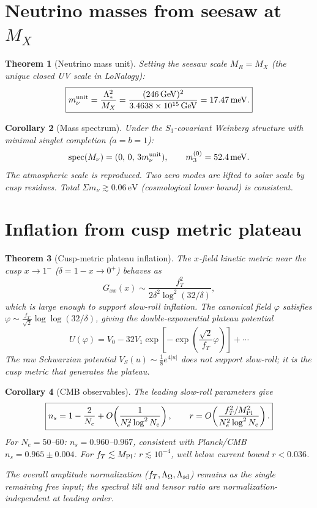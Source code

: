 \documentclass[12pt]{article}
\theoremstyle{plain}
\newtheorem{theorem}{Theorem}[section]
\newtheorem{corollary}[theorem]{Corollary}
\theoremstyle{definition}
\numberwithin{equation}{section}
\begin{document}
\section{Neutrino masses from seesaw at \texorpdfstring{$M_X$}{MX}}\label{sec:neutrino}

\begin{theorem}[Neutrino mass unit]\label{thm:mnu}
Setting the seesaw scale $M_R = M_X$ (the unique closed UV scale in LoNalogy):
\[
\boxed{m_\nu^{\rm unit} = \frac{\Lambda_*^2}{M_X}
= \frac{(246\,\mathrm{GeV})^2}{3.4638\times10^{15}\,\mathrm{GeV}}
= 17.47\,\mathrm{meV}.}
\]
\end{theorem}

\begin{corollary}[Mass spectrum]
Under the $S_3$-covariant Weinberg structure with minimal singlet completion ($a=b=1$):
\[
\mathrm{spec}(M_\nu) = (0,\,0,\,3m_\nu^{\rm unit}),\qquad
m_3^{(0)} = 52.4\,\mathrm{meV}.
\]
The atmospheric scale is reproduced.  Two zero modes are lifted to solar scale by cusp residues.
Total $\Sigma m_\nu \gtrsim 0.06\,\mathrm{eV}$ (cosmological lower bound) is consistent.
\end{corollary}

\section{Inflation from cusp metric plateau}\label{sec:inflation}

\begin{theorem}[Cusp-metric plateau inflation]\label{thm:inflation}
The $x$-field kinetic metric near the cusp $x\to1^-$ ($\delta = 1-x \to 0^+$) behaves as
\[
G_{xx}(x) \sim \frac{f_T^2}{2\delta^2\log^2(32/\delta)},
\]
which is large enough to support slow-roll inflation.  The canonical field $\varphi$ satisfies
$\varphi \sim \frac{f_T}{\sqrt{2}}\log\log(32/\delta)$, giving the double-exponential plateau potential
\[
U(\varphi) = V_0 - 32V_1\exp\!\left[-\exp\!\!\left(\frac{\sqrt{2}}{f_T}\varphi\right)\right] + \cdots
\]
The raw Schwarzian potential $V_S(u)\sim\frac{1}{8}e^{4|u|}$ does \emph{not} support slow-roll; it is the cusp metric that generates the plateau.
\end{theorem}

\begin{corollary}[CMB observables]
The leading slow-roll parameters give
\[
\boxed{n_s = 1 - \frac{2}{N_e} + O\!\left(\frac{1}{N_e^2\log^2 N_e}\right),
\qquad
r = O\!\left(\frac{f_T^2/M_{\rm Pl}^2}{N_e^2\log^2 N_e}\right).}
\]
For $N_e = 50$--$60$: $n_s = 0.960$--$0.967$, consistent with Planck/CMB $n_s = 0.965\pm0.004$.
For $f_T \lesssim M_{\rm Pl}$: $r \lesssim 10^{-4}$, well below current bound $r<0.036$.

The overall amplitude normalization ($f_T, \Lambda_\Omega, \Lambda_{\rm sd}$) remains as the single remaining free input; the spectral tilt and tensor ratio are normalization-independent at leading order.
\end{corollary}
\end{document}

